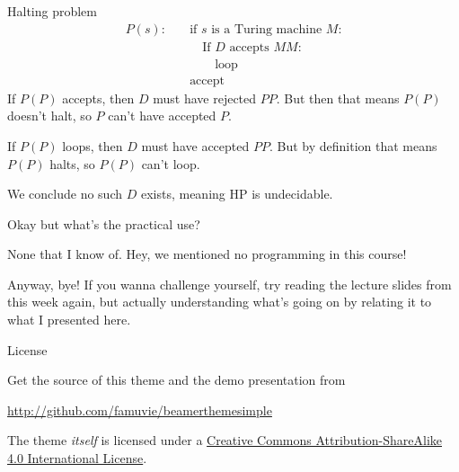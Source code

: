 \documentclass{beamer}
\begin{document}
\begin{frame}{Halting problem}
\begin{align*}
P(s): & \quad \text{if $s$ is a Turing machine $M$:}\\
& \quad \quad \text{If $D$ accepts $MM$:}\\
& \quad \quad \quad \text{loop}\\
& \quad \text{accept}
\end{align*}
If $P(P)$ accepts, then $D$ must have rejected $PP$. But then that means $P(P)$ doesn't halt, so $P$ can't have accepted $P$.

\vspace{2mm}

If $P(P)$ loops, then $D$ must have accepted $PP$. But by definition that means $P(P)$ halts, so $P(P)$ can't loop. 

\vspace{2mm}

We conclude no such $D$ exists, meaning $\text{HP}$ is undecidable.

\end{frame}

\begin{frame}{Okay but what's the practical use?}

None that I know of. Hey, we mentioned no programming in this course!

\vspace{2mm}


Anyway, bye! If you wanna challenge yourself, try reading the lecture slides from this week again, but actually understanding what's going on by relating it to what I presented here.

\end{frame}

\begin{frame}{License}

  \begin{block}{Get the source of this theme and the demo presentation from}

  \begin{center}\url{http://github.com/famuvie/beamerthemesimple}\end{center}

  \end{block}
  
  The theme \emph{itself} is licensed under a
  \href{http://creativecommons.org/licenses/by-sa/4.0/}{Creative Commons
  Attribution-ShareAlike 4.0 International License}.

  \begin{center}\ccbysa\end{center}

\end{frame}
\end{document}
